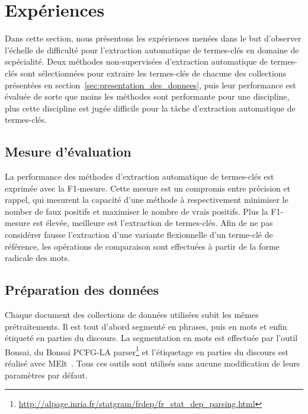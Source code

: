 \section{Expériences}
\label{sec:experiences}
  Dans cette section, nous présentons les expériences menées dans le but
  d'observer l'échelle de difficulté pour l'extraction automatique de
  termes-clés en domaine de scpécialité. Deux méthodes non-supervisées
  d'extraction automatique de termes-clés sont sélectionnées pour extraire les
  termes-clés de chacune des collections présentées en
  section~\ref{sec:presentation_des_donnees}, puis leur performance est évaluée
  de sorte que moins les méthodes sont performante pour une discipline, plus
  cette discipline est jugée difficile pour la tâche d'extraction automatique de
  termes-clés.

  \subsection{Mesure d'évaluation}
  \label{subsec:mesure_d_evaluation}
    La performance des méthodes d'extraction automatique de termes-clés est
    exprimée avec la F1-mesure. Cette mesure est un compromis entre précision et
    rappel, qui mesurent la capacité d'une méthode à respectivement minimiser le
    nomber de faux positifs et maximiser le nombre de vrais positifs. Plus la
    F1-mesure est élevée, meilleure est l'extraction de termes-clés. Afin de ne
    pas considérer fausse l'extraction d'une variante flexionnelle d'un
    terme-clé de référence, les opérations de comparaison sont effectuées à
    partir de la forme radicale des mots.

  \subsection{Préparation des données}
  \label{subsec:preparation_des_donnees}
    Chaque document des collections de données utilisées subit les mêmes
    prétraitements. Il est tout d'abord segmenté en phrases, puis en mots et
    enfin étiqueté en parties du discours. La segmentation en mots est effectuée
    par l'outil Bonsai, du Bonsai PCFG-LA
    parser\footnote{\url{http://alpage.inria.fr/statgram/frdep/fr_stat_dep_parsing.html}}
    et l'étiquetage en parties du discours est réalisé avec
    MElt~\cite{denis2009melt}. Tous ces outils sont utilisés sans aucune
    modification de leurs paramètres par défaut.


